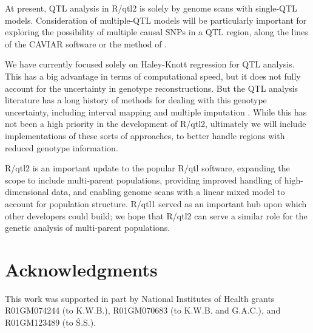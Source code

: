 \documentclass[12pt,letterpaper]{article}
\begin{document}
At present, QTL analysis in R/qtl2 is solely by genome scans with
single-QTL models. Consideration of multiple-QTL models will be
particularly important for exploring the possibility of multiple
causal SNPs in a QTL region, along the lines of the CAVIAR software
\citep{caviar} or the method of \citet{deng2018}.

We have currently focused solely on Haley-Knott regression
\citep{haley1992} for QTL analysis. This has a big advantage in terms
of computational speed, but it does not fully account for the
uncertainty in genotype reconstructions. But the QTL analysis
literature has a long history of methods for dealing with this
genotype uncertainty, including
interval mapping \citep{lander1989} and
multiple imputation \citep{sen2001}. While this has not been a high
priority in the development of R/qtl2, ultimately we will include
implementations of these sorts of approaches, to better handle regions
with reduced genotype information.

R/qtl2 is an important update to the popular R/qtl software,
expanding the scope to include multi-parent populations, providing
improved handling of high-dimensional data, and enabling genome scans
with a linear mixed model to account for population structure. R/qtl1
served as an important hub upon which other developers could build; we
hope that R/qtl2 can serve a similar role for the genetic analysis of
multi-parent populations.



\clearpage
\section*{Acknowledgments}

This work was supported in part by National Institutes of Health
grants R01GM074244 (to K.W.B.), R01GM070683 (to K.W.B. and G.A.C.),
and R01GM123489 (to \'S.S.).


\clearpage

\renewcommand*{\refname}{\normalfont\sffamily\bfseries Literature Cited}

\end{document}
